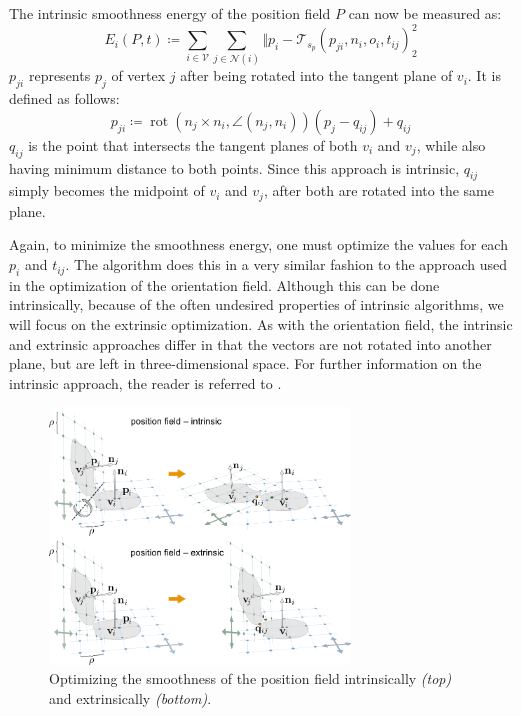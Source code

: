 \documentclass{ACGSeminar}
\DeclareMathOperator{\rot}{rot}
\begin{document}
The intrinsic smoothness energy of the position field $P$ can now be measured as:
\begin{equation*}
	E_i(P,t) \coloneqq \sum_{i \in \mathcal{V}} \sum_{j \in \mathcal{N}(i)} \Vert p_i - \mathcal{T}_{s_p}(p_{ji}, n_i, o_i, t_{ij})^2_2
\end{equation*}
$p_{ji}$ represents $p_j$ of vertex $j$ after being rotated into the tangent plane of $v_i$. It is defined as follows:
\begin{equation*}
	p_{ji} \coloneqq \rot(n_j \times n_i, \angle(n_j, n_i)) (p_j - q_{ij}) + q_{ij}
\end{equation*}
$q_{ij}$ is the point that intersects the tangent planes of both $v_i$ and $v_j$, while also having minimum distance to both points. Since this approach is intrinsic, $q_{ij}$ simply becomes the midpoint of $v_i$ and $v_j$, after both are rotated into the same plane.\bigskip

Again, to minimize the smoothness energy, one must optimize the values for each $p_i$ and $t_{ij}$. The algorithm does this in a very similar fashion to the approach used in the optimization of the orientation field. Although this can be done intrinsically, because of the often undesired properties of intrinsic algorithms, we will focus on the extrinsic optimization. As with the orientation field, the intrinsic and extrinsic approaches differ in that the vectors are not rotated into another plane, but are left in three-dimensional space. For further information on the intrinsic approach, the reader is referred to \cite{jakob2015instant}.

\begin{figure}[htb!]
	\begin{centering}
		\includegraphics[width=8cm]{img/position-field-intrinsic-extrinsic.png}\par
	\end{centering}
	\caption{Optimizing the smoothness of the position field intrinsically \textit{(top)} and extrinsically \textit{(bottom)}. \cite{jakob2015instant}}
	\label{fig:position-field-intrinsic-extrinsic}
\end{figure}
\end{document}
